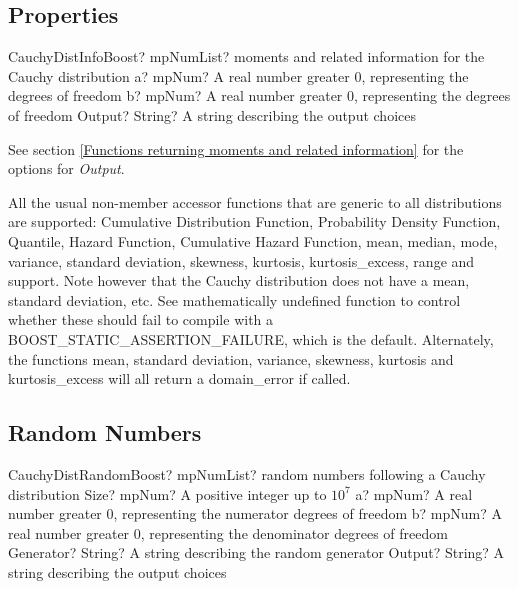 \subsection{Properties}
\label{CauchyDistributionProperties}


\begin{mpFunctionsExtract}
	\mpFunctionThreeNotImplemented
	{CauchyDistInfoBoost? mpNumList? moments and related information for the Cauchy distribution}
	{a? mpNum? A real number greater 0, representing the degrees of freedom}
	{b? mpNum? A real number greater 0, representing the degrees of freedom}
	{Output? String? A string describing the output choices}
\end{mpFunctionsExtract}

\vspace{0.3cm}

See section \ref{Functions returning moments and related information} for the options for {\itshape\sffamily Output}. 

All the usual non-member accessor functions that are generic to all distributions are supported: Cumulative Distribution Function,
Probability Density Function, Quantile, Hazard Function, Cumulative Hazard Function, mean, median, mode, variance, standard
deviation, skewness, kurtosis, kurtosis\_excess, range and support.
Note however that the Cauchy distribution does not have a mean, standard deviation, etc. See mathematically undefined function  to
control whether these should fail to compile with a BOOST\_STATIC\_ASSERTION\_FAILURE, which is the default.
Alternately, the functions mean, standard deviation, variance, skewness, kurtosis and kurtosis\_excess will all return a domain\_error
if called.



\subsection{Random Numbers}
\begin{mpFunctionsExtract}
	\mpFunctionFiveNotImplemented
	{CauchyDistRandomBoost? mpNumList? random numbers following a Cauchy distribution}
	{Size? mpNum? A positive integer up to $10^7$}
	{a? mpNum? A real number greater 0, representing the numerator  degrees of freedom}
	{b? mpNum? A real number greater 0, representing the denominator degrees of freedom}
	{Generator? String? A string describing the random generator}
	{Output? String? A string describing the output choices}
\end{mpFunctionsExtract}

